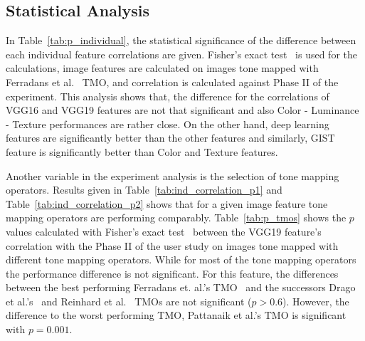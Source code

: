 \subsection{Statistical Analysis}
In Table~\ref{tab:p_individual}, the statistical significance of the difference between each individual feature correlations are given. Fisher's exact test~\cite{fisher1922interpretation} is used for the calculations, image features are calculated on images tone mapped with Ferradans et al.~\cite{ferradans2011analysis} TMO, and correlation is calculated against Phase II of the experiment. This analysis shows that, the difference for the correlations of VGG16 and VGG19 features are not that significant and also Color - Luminance - Texture performances are rather close. On the other hand, deep learning features are significantly better than the other features and similarly, GIST feature is significantly better than Color and Texture features.


\begin{table}
\centering
{}
\caption{$p$ values for statistical significance between individual image features, calculated with Fisher's exact test.}
\label{tab:p_individual}
\end{table}

Another variable in the experiment analysis is the selection of tone mapping operators. Results given in Table~\ref{tab:ind_correlation_p1} and Table~\ref{tab:ind_correlation_p2} shows that for a given image feature tone mapping operators are performing comparably. Table~\ref{tab:p_tmos} shows the $p$ values calculated with Fisher's exact test~\cite{fisher1922interpretation} between the VGG19 feature's correlation with the Phase II of the user study on images tone mapped with different tone mapping operators. While for most of the tone mapping operators the performance difference is not significant. For this feature, the differences between the best performing Ferradans et. al.'s TMO~\cite{ferradans2011analysis} and the successors Drago et al.'s~\cite{drago2003adaptive} and Reinhard et al.~\cite{reinhard2002photographic} TMOs are not significant ($p > 0.6$). However, the difference to the worst performing TMO, Pattanaik et al.'s TMO is significant with $p=0.001$.

